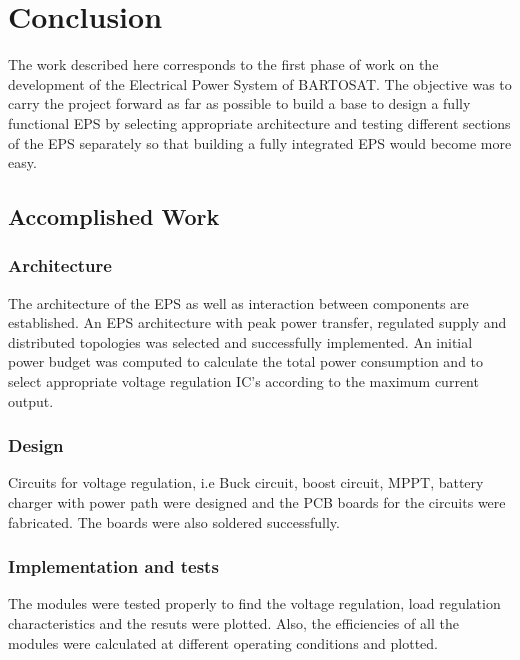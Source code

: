 

\chapter{Conclusion}

The work described here corresponds to the first phase of work on the development of the
Electrical Power System of BARTOSAT. The objective was to carry the project forward as far as
possible to build a base to design a fully functional EPS by selecting appropriate architecture and testing different sections of the EPS separately so that building a fully integrated EPS would become more easy.

\section{Accomplished Work}
\subsection{Architecture}
The architecture of the EPS as well as interaction between components are established. An EPS architecture with peak power transfer, regulated supply and distributed topologies was selected and successfully implemented. An initial power budget was computed to calculate the total power consumption and to select appropriate voltage regulation IC's according to the maximum current output.

\subsection{Design}

Circuits for voltage regulation, i.e Buck circuit, boost circuit, MPPT, battery charger with power path were designed and the PCB boards for the circuits were fabricated. The boards were also soldered successfully.

\subsection{Implementation and tests}
The modules were tested properly to find the voltage regulation, load regulation characteristics and the resuts were plotted. Also, the efficiencies of all the modules were calculated at different operating conditions and plotted.

